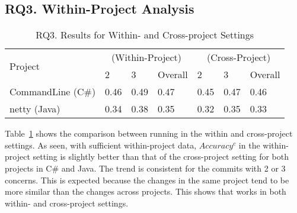 \subsection{RQ3. Within-Project Analysis}

\begin{table}[t]
	\caption{RQ3. Results for Within- and Cross-project Settings}
	\vspace{-0.1in}
	\begin{center}
		\footnotesize
		\tabcolsep 4pt
		\renewcommand{\arraystretch}{1} \begin{tabular}{p{2cm}<{\centering}|p{0.8cm}<{\centering}p{0.8cm}<{\centering}p{0.8cm}<{\centering}|p{0.8cm}<{\centering}p{0.8cm}<{\centering}p{0.8cm}<{\centering}}
			
			\hline
			\multirow{2}{*}{Project}     & \multicolumn{3}{c|}{\tool (Within-Project)} & \multicolumn{3}{c}{\tool (Cross-Project)}\\
			\cline{2-7}
			                               &        2       &      3         & Overall  &      2       &        3     & Overall    \\
			
			\hline
			CommandLine (C\#)   &  0.46  & 0.49  &     0.47          &	0.45   & 0.47 &	0.46	       \\
                        netty (Java)   &  0.34  & 0.38  &     0.35          &	0.32   & 0.35 &	0.33	       \\

			\hline
		\end{tabular}
		\label{RQ3-result}
		
	\end{center}
\end{table}


Table~\ref{RQ3-result} shows the comparison between running {\tool} in
the within and cross-project settings. As seen, with sufficient
within-project data, $Accuracy^{c}$ in the within-project setting is
slightly better than that of the cross-project setting for both
projects in C\# and Java. The trend is consistent for the commits with
2 or 3 concerns. This is expected because the changes in the same
project tend to be more similar than the changes across projects.
This shows that {\tool} works in both within- and cross-project
settings.

